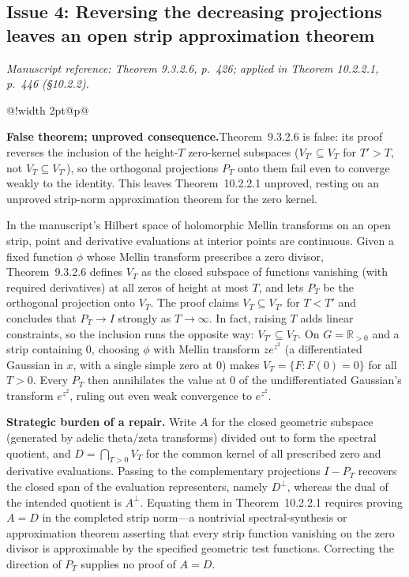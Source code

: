 \documentclass[11pt,letterpaper]{article}
\makeatletter
\newcommand{\msloc}[1]{%
  {\small\color{locgray}\itshape Manuscript reference: #1.}\par\nobreak\vspace{3pt}\@afterindentfalse\@afterheading
}
\newcommand{\issuefinding}[2]{%
  \begingroup
  \setlength{\fboxsep}{0pt}%
  \noindent\colorbox{barbg}{%
    \begin{tabular}{@{}!{\color{baraccent}\vrule width 2pt}@{\hspace{8pt}}p{\dimexpr\linewidth-18pt\relax}@{\hspace{8pt}}}
      \rule{0pt}{11.5pt}\small\textbf{\color{baraccent}#1}\enspace #2\rule[-4.5pt]{0pt}{0pt}
    \end{tabular}%
  }%
  \endgroup
  \par\nobreak\vspace{4.5pt}\@afterindentfalse\@afterheading
}
\newcommand{\R}{\mathbb{R}}
\makeatother
\begin{document}
\subsection{Issue 4: Reversing the decreasing projections leaves an open strip approximation theorem}
\msloc{Theorem 9.3.2.6, p.~426; applied in Theorem 10.2.2.1, p.~446 (\S10.2.2)}
\issuefinding{False theorem; unproved consequence.}{Theorem~9.3.2.6 is false: its proof reverses the inclusion of the height-$T$ zero-kernel subspaces ($V_{T'}\subseteq V_T$ for $T'>T$, not $V_T\subseteq V_{T'}$), so the orthogonal projections $P_T$ onto them fail even to converge weakly to the identity. This leaves Theorem~10.2.2.1 unproved, resting on an unproved strip-norm approximation theorem for the zero kernel.}

In the manuscript's Hilbert space of holomorphic Mellin transforms on an open strip, point and derivative evaluations at interior points are continuous. Given a fixed function $\phi$ whose Mellin transform prescribes a zero divisor, Theorem~9.3.2.6 defines $V_T$ as the closed subspace of functions vanishing (with required derivatives) at all zeros of height at most $T$, and lets $P_T$ be the orthogonal projection onto $V_T$. The proof claims $V_T \subseteq V_{T'}$ for $T < T'$ and concludes that $P_T\to I$ strongly as $T\to\infty$. In fact, raising $T$ adds linear constraints, so the inclusion runs the opposite way: $V_{T'}\subseteq V_T$. On $G=\R_{>0}$ and a strip containing $0$, choosing $\phi$ with Mellin transform $z e^{z^2}$ (a differentiated Gaussian in $x$, with a single simple zero at $0$) makes $V_T = \{F : F(0)=0\}$ for all $T>0$. Every $P_T$ then annihilates the value at $0$ of the undifferentiated Gaussian's transform $e^{z^2}$, ruling out even weak convergence to $e^{z^2}$.

\textbf{Strategic burden of a repair.} Write $A$ for the closed geometric subspace (generated by adelic theta/zeta transforms) divided out to form the spectral quotient, and $D = \bigcap_{T>0} V_T$ for the common kernel of all prescribed zero and derivative evaluations. Passing to the complementary projections $I - P_T$ recovers the closed span of the evaluation representers, namely $D^\perp$, whereas the dual of the intended quotient is $A^\perp$. Equating them in Theorem~10.2.2.1 requires proving $A = D$ in the completed strip norm---a nontrivial spectral-synthesis or approximation theorem asserting that every strip function vanishing on the zero divisor is approximable by the specified geometric test functions. Correcting the direction of $P_T$ supplies no proof of $A = D$.
\end{document}
